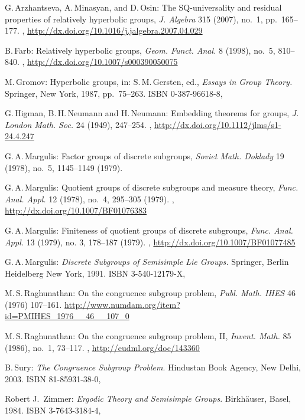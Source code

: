 \begin{references}{99}

G.\,Arzhantseva, A.\,Minasyan, and D.\,Osin:
 The SQ-universality and residual properties of relatively hyperbolic groups,
\emph{J. Algebra} 315 (2007), no.~1, pp.~165--177.
,
\maynewline
\url{http://dx.doi.org/10.1016/j.jalgebra.2007.04.029}

B.\,Farb:
Relatively hyperbolic groups,
\emph{Geom. Funct. Anal.} 8 (1998), no.~5, 810--840. 
,
\maynewline
\url{http://dx.doi.org/10.1007/s000390050075}

M.\,Gromov:
 Hyperbolic groups, in:
S.\,M.\,Gersten, ed., \emph{Essays in Group Theory.}
 Springer, New York, 1987,
pp.~75--263.
 ISBN 0-387-96618-8,

G.\,Higman, B.\,H.\,Neumann and H.\,Neumann:
 Embedding theorems for groups, 
\emph{J. London Math. Soc.} 24 (1949), 247--254.
,
\maynewline
\url{http://dx.doi.org/10.1112/jlms/s1-24.4.247}

 G.\,A.\,Margulis:
Factor groups of discrete subgroups,
 \emph{Soviet Math. Doklady} 19 (1978), no.~5, 1145--1149 (1979).

 G.\,A.\,Margulis:
Quotient groups of discrete subgroups and measure theory,
 \emph{Func. Anal. Appl.} 12 (1978), no.~4, 295--305 (1979).
,
\maynewline
\url{http://dx.doi.org/10.1007/BF01076383}

 G.\,A.\,Margulis:
Finiteness of quotient groups of discrete subgroups,
 \emph{Func. Anal. Appl.}  13  (1979), no. 3, 178--187 (1979).
,
\maynewline
\url{http://dx.doi.org/10.1007/BF01077485}

 G.\,A.\,Margulis:
 \emph{Discrete Subgroups of Semisimple Lie Groups.}
 Springer, {Berlin Heidelberg New York}, 1991.
ISBN 3-540-12179-X,

M.\,S.\,Raghunathan:
 On the congruence subgroup problem,
 \emph{Publ. Math. IHES} 46 (1976) 107--161.
\url{http://www.numdam.org/item?id=PMIHES_1976__46__107_0}

M.\,S.\,Raghunathan:
 On the congruence subgroup problem, II,
 \emph{Invent. Math.} 85 (1986), no.~1, 73--117.
,
\maynewline
\url{http://eudml.org/doc/143360}

B.\,Sury:
\emph{The Congruence Subgroup Problem}. 
 Hindustan Book Agency, New Delhi, 2003.
 ISBN 81-85931-38-0,

Robert J.\ Zimmer:
 \emph{Ergodic Theory and Semisimple Groups}.
Birkh\"auser, Basel, 1984.
ISBN 3-7643-3184-4,


\end{references}
